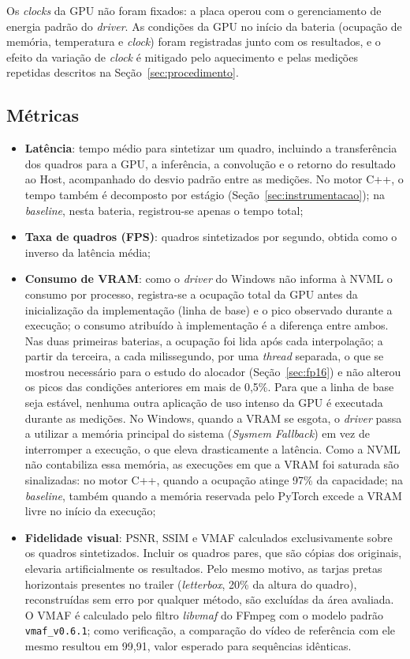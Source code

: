 \documentclass[
    12pt,                %
    openright,           %
    oneside,             %
    a4paper,             %
    english,             %
    brazil               %
]{abntex2}
\begin{document}
Os \textit{clocks} da GPU não foram fixados: a placa operou com o gerenciamento de energia padrão do \textit{driver}. As condições da GPU no início da bateria (ocupação de memória, temperatura e \textit{clock}) foram registradas junto com os resultados, e o efeito da variação de \textit{clock} é mitigado pelo aquecimento e pelas medições repetidas descritos na Seção~\ref{sec:procedimento}.

\subsection{Métricas}
\label{sec:metricas}

\begin{itemize}
    \item \textbf{Latência}: tempo médio para sintetizar um quadro, incluindo a transferência dos quadros para a GPU, a inferência, a convolução e o retorno do resultado ao Host, acompanhado do desvio padrão entre as medições. No motor C++, o tempo também é decomposto por estágio (Seção~\ref{sec:instrumentacao}); na \textit{baseline}, nesta bateria, registrou-se apenas o tempo total;
    \item \textbf{Taxa de quadros (FPS)}: quadros sintetizados por segundo, obtida como o inverso da latência média;
    \item \textbf{Consumo de VRAM}: como o \textit{driver} do Windows não informa à NVML o consumo por processo, registra-se a ocupação total da GPU antes da inicialização da implementação (linha de base) e o pico observado durante a execução; o consumo atribuído à implementação é a diferença entre ambos. Nas duas primeiras baterias, a ocupação foi lida após cada interpolação; a partir da terceira, a cada milissegundo, por uma \textit{thread} separada, o que se mostrou necessário para o estudo do alocador (Seção~\ref{sec:fp16}) e não alterou os picos das condições anteriores em mais de 0,5\%. Para que a linha de base seja estável, nenhuma outra aplicação de uso intenso da GPU é executada durante as medições. No Windows, quando a VRAM se esgota, o \textit{driver} passa a utilizar a memória principal do sistema (\textit{Sysmem Fallback}) em vez de interromper a execução, o que eleva drasticamente a latência. Como a NVML não contabiliza essa memória, as execuções em que a VRAM foi saturada são sinalizadas: no motor C++, quando a ocupação atinge 97\% da capacidade; na \textit{baseline}, também quando a memória reservada pelo PyTorch excede a VRAM livre no início da execução;
    \item \textbf{Fidelidade visual}: PSNR, SSIM e VMAF calculados exclusivamente sobre os quadros sintetizados. Incluir os quadros pares, que são cópias dos originais, elevaria artificialmente os resultados. Pelo mesmo motivo, as tarjas pretas horizontais presentes no trailer (\textit{letterbox}, 20\% da altura do quadro), reconstruídas sem erro por qualquer método, são excluídas da área avaliada. O VMAF é calculado pelo filtro \textit{libvmaf} do FFmpeg \cite{NetflixVMAFRepo} com o modelo padrão \texttt{vmaf\_v0.6.1}; como verificação, a comparação do vídeo de referência com ele mesmo resultou em 99,91, valor esperado para sequências idênticas.
\end{itemize}
\end{document}
